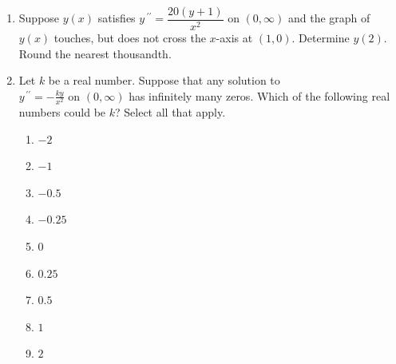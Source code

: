 \documentclass{ximera}
\begin{document}
\begin{enumerate}[label=(\arabic*)]

\item Suppose $y(x)$ satisfies $y\,^{\prime\prime}=\dfrac{20(y+1)}{x^2}$ on $(0,\infty)$ and the graph of $y(x)$ touches, but does not cross the $x$-axis at $(1,0)$.  Determine $y(2)$.  Round the nearest thousandth.







\newpage

\item Let $k$ be a real number.  Suppose that any solution to \\$\displaystyle y^{\,\prime\prime} = -\frac{ky}{x^2}$ on $(0,\infty)$ has infinitely many zeros.  Which of the following real numbers could be $k$?  Select all that apply.


\begin{enumerate}[label=(\alph*)]
\item $-2$
\item $-1$
\item $-0.5$
\item $-0.25$
\item $0$
\item $0.25$
\item $0.5$ %
\item $1$ %
\item $2$ %
\end{enumerate}

 



\end{enumerate}
\end{document}
